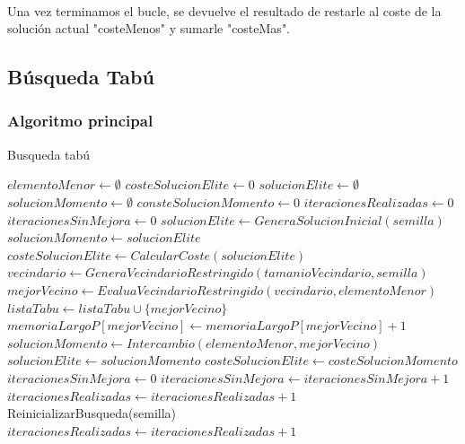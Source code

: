 \documentclass{article}
\begin{document}
	\paragraph{}Una vez terminamos el bucle, se devuelve el resultado de restarle al coste de la solución actual "costeMenos" y sumarle "costeMas".
	
	\subsection{Búsqueda Tabú}
	
		\subsubsection{Algoritmo principal}
	
		\begin{algorithm}[H]
			\caption{Busqueda tabú}
			\begin{algorithmic}
				\STATE $elementoMenor \leftarrow \emptyset$
				\STATE $costeSolucionElite \leftarrow 0$
				\STATE $solucionElite \leftarrow \emptyset$
				\STATE $solucionMomento \leftarrow \emptyset$
				\STATE $consteSolucionMomento \leftarrow 0$
				\STATE $iteracionesRealizadas \leftarrow 0$
				\STATE $iteracionesSinMejora \leftarrow 0$
				\STATE $solucionElite \leftarrow GeneraSolucionInicial(semilla)$
				\STATE $solucionMomento \leftarrow solucionElite$
				\STATE $costeSolucionElite \leftarrow CalcularCoste(solucionElite)$
				\STATE $vecindario \leftarrow GeneraVecindarioRestringido(tamanioVecindario,semilla)$
				\STATE $mejorVecino \leftarrow EvaluaVecindarioRestringido(vecindario,elementoMenor)$
				\ENDFOR
				\STATE $listaTabu \leftarrow listaTabu \cup \{mejorVecino\}$
				\STATE $memoriaLargoP[mejorVecino] \leftarrow memoriaLargoP[mejorVecino]+1$
				\STATE $solucionMomento \leftarrow Intercambio(elementoMenor, mejorVecino)$
				\STATE $solucionElite \leftarrow solucionMomento$
				\STATE $costeSolucionElite \leftarrow costeSolucionMomento$
				\STATE $iteracionesSinMejora \leftarrow 0$
				\ELSE
				\STATE $iteracionesSinMejora \leftarrow iteracionesSinMejora+1$
				\ENDIF
				\STATE $iteracionesRealizadas \leftarrow iteracionesRealizadas+1$
				\STATE ReinicializarBusqueda(semilla)
				\STATE $iteracionesRealizadas \leftarrow iteracionesRealizadas+1$
				\ENDIF
				\ENDWHILE
			\end{algorithmic}
		\end{algorithm}
		
\end{document}
